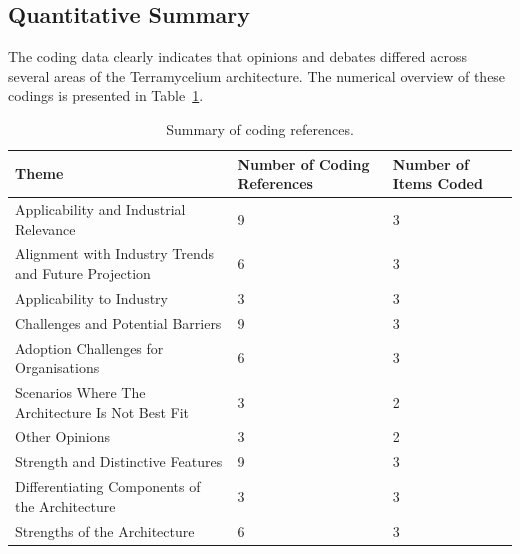 \documentclass[review]{elsarticle}
\begin{document}
\subsection{Quantitative Summary} \label{expertOpinion_quantitativeSummary}

The coding data clearly indicates that opinions and debates differed across several areas of the Terramycelium architecture. The numerical overview of these codings is presented in Table~\ref{tab:coding_summary}.

\begin{table}

  \centering

  \caption{Summary of coding references.}

  \begin{tabular}{p{}p{}p{}}

  \hline

  Theme & Number of Coding References & Number of Items Coded \\

  \hline

  Applicability and Industrial Relevance & 9 & 3 \\

  Alignment with Industry Trends and Future Projection & 6 & 3 \\

  Applicability to Industry & 3 & 3 \\

  Challenges and Potential Barriers & 9 & 3 \\

  Adoption Challenges for Organisations & 6 & 3 \\

  Scenarios Where The Architecture Is Not Best Fit & 3 & 2 \\

  Other Opinions & 3 & 2 \\

  Strength and Distinctive Features & 9 & 3 \\

  Differentiating Components of the Architecture & 3 & 3 \\

  Strengths of the Architecture & 6 & 3 \\

  \hline

  \end{tabular}

  \label{tab:coding_summary}

  \end{table}
\end{document}
